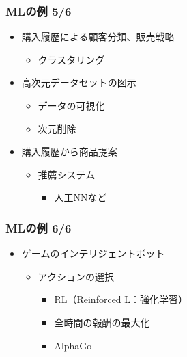 \documentclass[aspectratio=169, dvipdfmx, 14pt, xcolor={svgnames,dvipsnames}]{beamer}
\def\tightlist{\itemsep1pt\parskip0pt\parsep0pt}
\begin{document}
\begin{frame}
  \frametitle{MLの例 5/6}
  \begin{itemize}
    \item
          購入履歴による顧客分類、販売戦略

          \begin{itemize}
            \tightlist
            \item
                  クラスタリング
          \end{itemize}
    \item
          高次元データセットの図示

          \begin{itemize}
            \tightlist
            \item
                  データの可視化
            \item
                  次元削除
          \end{itemize}
    \item
          購入履歴から商品提案

          \begin{itemize}
            \tightlist
            \item
                  推薦システム

                  \begin{itemize}
                    \tightlist
                    \item
                          人工NNなど
                  \end{itemize}
          \end{itemize}
  \end{itemize}
\end{frame}


\begin{frame}
  \frametitle{MLの例 6/6}
  \begin{itemize}
    \item
          ゲームのインテリジェントボット

          \begin{itemize}
            \tightlist
            \item
                  アクションの選択

                  \begin{itemize}
                    \tightlist
                    \item
                          RL（Reinforced L：強化学習）

                          \tightlist
                    \item
                          全時間の報酬の最大化
                    \item
                          AlphaGo
                  \end{itemize}
          \end{itemize}
  \end{itemize}
\end{frame}
\end{document}
